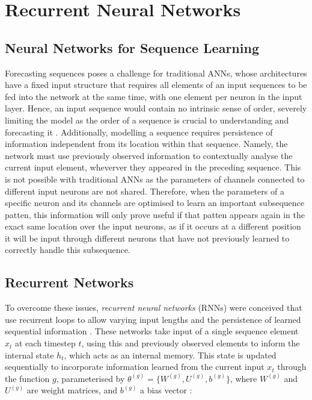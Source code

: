 \documentclass[a4paper, 11pt]{report}
\begin{document}
    \section{Recurrent Neural Networks}

    \subsection{Neural Networks for Sequence Learning}

    Forecasting sequences poses a challenge for traditional ANNs, whose architectures have a fixed input structure that requires all elements of an input sequences to be fed into the network at the same time, with one element per neuron in the input layer. Hence, an input sequence would contain no intrinsic sense of order, severely limiting the model as the order of a sequence is crucial to understanding and forecasting it \citep{tsantekidis-2022}. Additionally, modelling a sequence requires persistence of information independent from its location within that sequence. Namely, the network must use previously observed information to contextually analyse the current input element, wheverver they appeared in the preceding sequence. This is not possible with traditional ANNs as the parameters of channels connected to different input neurons are not shared. Therefore, when the parameters of a specific neuron and its channels are optimised to learn an important subsequence patten, this information will only prove useful if that patten appears again in the exact same location over the input neurons, as if it occurs at a different position it will be input through different neurons that have not previously learned to correctly handle this subsequence.


    \subsection{Recurrent Networks}

    To overcome these issues, \emph{recurrent neural networks} (RNNs) were conceived that use recurrent loops to allow varying input lengths and the persistence of learned sequential information \citep{sharma-2022}. These networks take input of a single sequence element $x_t$ at each timestep $t$, using this and previously observed elements to inform the internal state $h_t$, which acts as an internal memory. This state is updated sequentially to incorporate information learned from the current input $x_t$ through the function $g$, parameterised by $\theta^{(g)} = \{ W^{(g)}, U^{(g)}, b^{(g)} \}$, where $W^{(g)}$ and $U^{(g)}$ are weight matrices, and $b^{(g)}$ a bias vector \citep{sharma-2022}:
\end{document}
